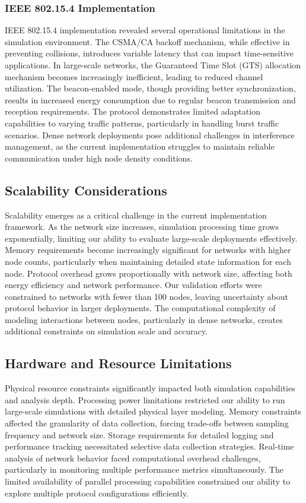 \documentclass[conference]{IEEEtran}
\begin{document}
\subsubsection{IEEE 802.15.4 Implementation}
IEEE 802.15.4 implementation revealed several operational limitations in the simulation environment. The CSMA/CA backoff mechanism, while effective in preventing collisions, introduces variable latency that can impact time-sensitive applications. In large-scale networks, the Guaranteed Time Slot (GTS) allocation mechanism becomes increasingly inefficient, leading to reduced channel utilization. The beacon-enabled mode, though providing better synchronization, results in increased energy consumption due to regular beacon transmission and reception requirements. The protocol demonstrates limited adaptation capabilities to varying traffic patterns, particularly in handling burst traffic scenarios. Dense network deployments pose additional challenges in interference management, as the current implementation struggles to maintain reliable communication under high node density conditions.

\subsection{Scalability Considerations}
Scalability emerges as a critical challenge in the current implementation framework. As the network size increases, simulation processing time grows exponentially, limiting our ability to evaluate large-scale deployments effectively. Memory requirements become increasingly significant for networks with higher node counts, particularly when maintaining detailed state information for each node. Protocol overhead grows proportionally with network size, affecting both energy efficiency and network performance. Our validation efforts were constrained to networks with fewer than 100 nodes, leaving uncertainty about protocol behavior in larger deployments. The computational complexity of modeling interactions between nodes, particularly in dense networks, creates additional constraints on simulation scale and accuracy.

\subsection{Hardware and Resource Limitations}
Physical resource constraints significantly impacted both simulation capabilities and analysis depth. Processing power limitations restricted our ability to run large-scale simulations with detailed physical layer modeling. Memory constraints affected the granularity of data collection, forcing trade-offs between sampling frequency and network size. Storage requirements for detailed logging and performance tracking necessitated selective data collection strategies. Real-time analysis of network behavior faced computational overhead challenges, particularly in monitoring multiple performance metrics simultaneously. The limited availability of parallel processing capabilities constrained our ability to explore multiple protocol configurations efficiently.
\end{document}
